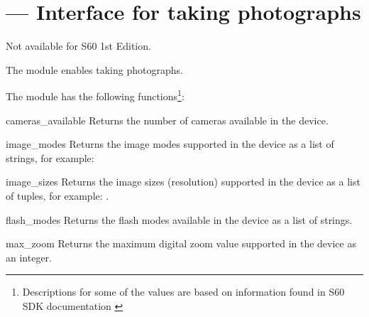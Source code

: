 %
%
%

\section{ ---
    Interface for taking photographs}

\label{sec:camera}

\begin{notice}[note]
Not available for S60 1st Edition.
\end{notice}

The  module enables taking photographs. 

The  module has the following functions\footnote{ 
Descriptions for some of the values are based on information found in S60 SDK documentation \cite{S60Doc}}:

\begin{funcdesc}{cameras_available}{}
Returns the number of cameras available in the device.
\end{funcdesc}

\begin{funcdesc}{image_modes}{}
Returns the image modes supported in the device as a list of strings, for 
example: 
\end{funcdesc}

\begin{funcdesc}{image_sizes}{}
Returns the image sizes (resolution) supported in the device as a list of 
 tuples, for example: \code{[(640, 480), (160, 120)]}.
\end{funcdesc}

\begin{funcdesc}{flash_modes}{}
Returns the flash modes available in the device as a list of strings. 
\end{funcdesc}

\begin{funcdesc}{max_zoom}{}
Returns the maximum digital zoom value supported in the device as an 
integer. 
\end{funcdesc}

